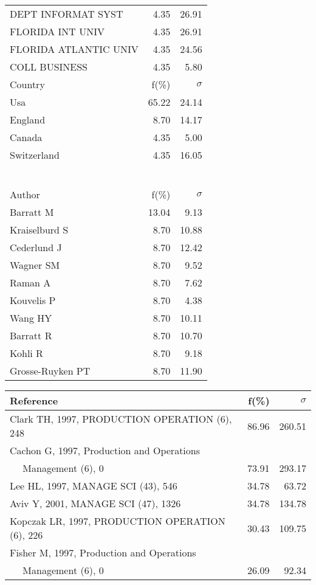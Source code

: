 \documentclass[a4paper,11pt]{report}
\begin{document}
\begin{landscape}
\begin{table}[!ht]
{\begin{tabular}{|l r r|}
DEPT INFORMAT SYST & 4.35 & 26.91\\
FLORIDA INT UNIV & 4.35 & 26.91\\
FLORIDA ATLANTIC UNIV & 4.35 & 24.56\\
COLL BUSINESS & 4.35 & 5.80\\
\hline
\hline
Country & f(\%) & $\sigma$\\
\hline
Usa & 65.22 & 24.14\\
England & 8.70 & 14.17\\
Canada & 4.35 & 5.00\\
Switzerland & 4.35 & 16.05\\
 &  & \\
 &  & \\
 &  & \\
 &  & \\
 &  & \\
 &  & \\
\hline
\hline
Author & f(\%) & $\sigma$\\
\hline
Barratt M & 13.04 & 9.13\\
Kraiselburd S & 8.70 & 10.88\\
Cederlund J & 8.70 & 12.42\\
Wagner SM & 8.70 & 9.52\\
Raman A & 8.70 & 7.62\\
Kouvelis P & 8.70 & 4.38\\
Wang HY & 8.70 & 10.11\\
Barratt R & 8.70 & 10.70\\
Kohli R & 8.70 & 9.18\\
Grosse-Ruyken PT & 8.70 & 11.90\\
\hline
\end{tabular}
}
{\scriptsize\begin{tabular}{|l r r|}
\hline
Reference & f(\%) & $\sigma$\\
\hline
Clark TH, 1997, PRODUCTION OPERATION (6), 248 & 86.96 & 260.51\\
Cachon G, 1997, Production and Operations &  & \\
$\quad$ Management (6), 0 & 73.91 & 293.17\\
Lee HL, 1997, MANAGE SCI (43), 546 & 34.78 & 63.72\\
Aviv Y, 2001, MANAGE SCI (47), 1326 & 34.78 & 134.78\\
Kopczak LR, 1997, PRODUCTION OPERATION (6), 226 & 30.43 & 109.75\\
Fisher M, 1997, Production and Operations &  & \\
$\quad$ Management (6), 0 & 26.09 & 92.34\\

\end{tabular}}
\end{table}
\end{landscape}
\end{document}
